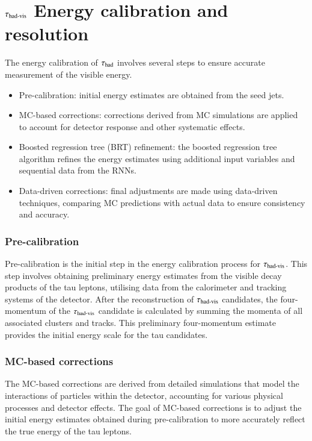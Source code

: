 \section{$\tau_{\text{had-vis}}$ Energy calibration and resolution}
    The energy calibration of $\tau_{\text{had}}$ involves several steps to ensure accurate 
    measurement of the visible energy.
    \begin{itemize}
        \item Pre-calibration: initial energy estimates are obtained from the seed jets.
        \item MC-based corrections: corrections derived from MC simulations are applied to account for detector response and other systematic effects.
        \item Boosted regression tree (BRT) refinement: the boosted regression tree algorithm refines the energy estimates using additional input variables and sequential data from the RNNs.
        \item Data-driven corrections: final adjustments are made using data-driven techniques, comparing MC predictions with actual data to ensure consistency and accuracy.
    \end{itemize}

    \subsubsection{Pre-calibration}
        Pre-calibration is the initial step in the energy calibration process for $\tau_{\text{had-vis}}$. 
        This step involves obtaining preliminary energy estimates from the visible decay products of the 
        tau leptons, utilising data from the calorimeter and tracking systems of the detector. After the 
        reconstruction of $\tau_{\text{had-vis}}$ candidates, the four-momentum of the $\tau_{\text{had-vis}}$
        candidate is calculated by summing the momenta of all associated clusters and tracks. 
        This preliminary four-momentum estimate provides the initial energy scale for the tau candidates.

    \subsubsection{MC-based corrections}
        The MC-based corrections are derived from detailed simulations that model the interactions of 
        particles within the detector, accounting for various physical processes and detector effects. 
        The goal of MC-based corrections is to adjust the initial energy estimates obtained during 
        pre-calibration to more accurately reflect the true energy of the tau leptons.
        
